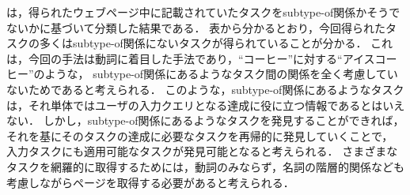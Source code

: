 \documentclass[submit,techreq]{ipsj}
\begin{document}
は，得られたウェブページ中に記載されていたタスクをsubtype-of関係かそうでないかに基づいて分類した結果である．
表から分かるとおり，今回得られたタスクの多くはsubtype-of関係にないタスクが得られていることが分かる．
これは，今回の手法は動詞に着目した手法であり，``コーヒー''に対する``アイスコーヒー''のような，
subtype-of関係にあるようなタスク間の関係を全く考慮していないためであると考えられる．
このような，subtype-of関係にあるようなタスクは，それ単体ではユーザの入力クエリとなる達成に役に立つ情報であるとはいえない．
しかし，subtype-of関係にあるようなタスクを発見することができれば，
それを基にそのタスクの達成に必要なタスクを再帰的に発見していくことで，
入力タスクにも適用可能なタスクが発見可能となると考えられる．
さまざまなタスクを網羅的に取得するためには，動詞のみならず，名詞の階層的関係なども考慮しながらページを取得する必要があると考えられる．

%
\end{document}
